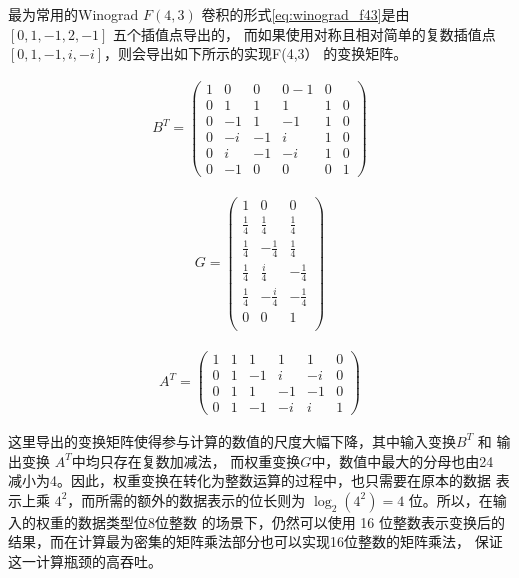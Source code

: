 最为常用的Winograd $F(4, 3)$ 卷积的形式\ref{eq:winograd_f43}是由 $ [0, 1, -1, 2, -1]$ 五个插值点导出的，
而如果使用对称且相对简单的复数插值点 $[0, 1, -1, i, -i]$，则会导出如下所示的实现F(4,3） 的变换矩阵。

\begin{align}
  B^T = 
  \begin{pmatrix}
    1 & 0 & 0 & 0 -1 & 0 \\
    0 & 1 & 1 & 1 & 1 & 0\\
    0 & -1 & 1 & -1 & 1 & 0 \\
    0 & -i & -1 & i & 1 & 0 \\
    0 & i & -1 & -i & 1 & 0 \\
    0 & -1 & 0 & 0 & 0 & 1
  \end{pmatrix}
\end{align}

\begin{align}
G = 
\begin{pmatrix}
  1 & 0 & 0 \\
  \frac{1}{4} & \frac{1}{4} & \frac{1}{4} \\
  \frac{1}{4} & -\frac{1}{4} & \frac{1}{4} \\
  \frac{1}{4} & \frac{i}{4} & -\frac{1}{4} \\
  \frac{1}{4} & -\frac{i}{4} & -\frac{1}{4} \\
  0 & 0 & 1 \\
\end{pmatrix}
\end{align}

\begin{align}
  A^T = 
  \begin{pmatrix}
    1 & 1 & 1 & 1 &1 &0\\ 
    0 & 1 & −1 & i & −i & 0\\
    0 & 1 & 1 & −1 & −1 & 0\\
    0 & 1 & −1 & −i & i & 1
  \end{pmatrix}
\end{align}

这里导出的变换矩阵使得参与计算的数值的尺度大幅下降，其中输入变换$B^T$ 和 输出变换 $A^T$中均只存在复数加减法，
而权重变换$G$中，数值中最大的分母也由24 减小为4。因此，权重变换在转化为整数运算的过程中，也只需要在原本的数据
表示上乘 $4^2$，而所需的额外的数据表示的位长则为 $\log_{2}(4^2) = 4$ 位。所以，在输入的权重的数据类型位8位整数
的场景下，仍然可以使用 16 位整数表示变换后的结果，而在计算最为密集的矩阵乘法部分也可以实现16位整数的矩阵乘法，
保证这一计算瓶颈的高吞吐。

